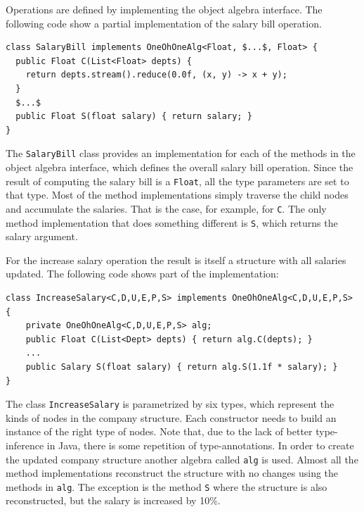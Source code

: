 Operations are defined by implementing the object algebra interface.
The following code show a partial implementation of the salary bill
operation.

\begin{lstlisting}[numbers=none,mathescape=true]
class SalaryBill implements OneOhOneAlg<Float, $...$, Float> {
  public Float C(List<Float> depts) {
    return depts.stream().reduce(0.0f, (x, y) -> x + y);
  }
  $...$
  public Float S(float salary) { return salary; }
}
\end{lstlisting}


The \lstinline{SalaryBill} class provides an implementation for each
of the methods in the object algebra interface, which defines the
overall salary bill operation. Since the result of computing the
salary bill is a \lstinline{Float}, all the type parameters are set to
that type. Most of the method implementations simply traverse the
child nodes and accumulate the salaries. That is the case, for
example, for \lstinline{C}. The only method implementation that does
something different is \lstinline{S}, which returns the salary
argument.

For the increase salary operation the result is itself a structure
with all salaries updated. The following code shows part of the
implementation:

\begin{lstlisting}[numbers=none]
class IncreaseSalary<C,D,U,E,P,S> implements OneOhOneAlg<C,D,U,E,P,S> {
	private OneOhOneAlg<C,D,U,E,P,S> alg;
	public Float C(List<Dept> depts) { return alg.C(depts); }
	...
	public Salary S(float salary) { return alg.S(1.1f * salary); }
}
\end{lstlisting}

The class \lstinline{IncreaseSalary} is parametrized by six types,
which represent the kinds of nodes in the company structure. Each
constructor needs to build an instance of the right type of nodes.
Note that, due to the lack of better type-inference in Java, there is
some repetition of type-annotations. In order to create the updated
company structure another algebra called \lstinline{alg} is used.
Almost all the method implementations reconstruct the structure with
no changes using the methods in \lstinline{alg}. The exception is the
method \lstinline{S} where the structure is also reconstructed, but
the salary is increased by 10\%.


